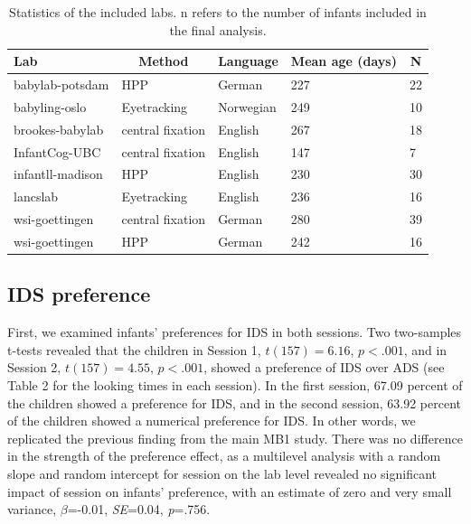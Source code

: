 \documentclass[
  man,floatsintext]{apa6}
\begin{document}
\begin{table}[tbp]

\begin{center}
\begin{threeparttable}

\caption{\label{tab:labs}Statistics of the included labs. n refers to the number of infants included in the final analysis.}

\begin{tabular}{lllll}
\toprule
Lab & \multicolumn{1}{c}{Method} & \multicolumn{1}{c}{Language} & \multicolumn{1}{c}{Mean age (days)} & \multicolumn{1}{c}{N}\\
\midrule
babylab-potsdam & HPP & German & 227 & 22\\
babyling-oslo & Eyetracking & Norwegian & 249 & 10\\
brookes-babylab & central fixation & English & 267 & 18\\
InfantCog-UBC & central fixation & English & 147 & 7\\
infantll-madison & HPP & English & 230 & 30\\
lancslab & Eyetracking & English & 236 & 16\\
wsi-goettingen & central fixation & German & 280 & 39\\
wsi-goettingen & HPP & German & 242 & 16\\
\bottomrule
\end{tabular}

\end{threeparttable}
\end{center}

\end{table}

\hypertarget{ids-preference}{%
\subsection{IDS preference}\label{ids-preference}}

First, we examined infants' preferences for IDS in both sessions. Two two-samples t-tests revealed that the children in Session 1, \(t(157) = 6.16\), \(p < .001\), and in Session 2, \(t(157) = 4.55\), \(p < .001\), showed a preference of IDS over ADS (see Table 2 for the looking times in each session). In the first session, 67.09 percent of the children showed a preference for IDS, and in the second session, 63.92 percent of the children showed a numerical preference for IDS. In other words, we replicated the previous finding from the main MB1 study. There was no difference in the strength of the preference effect, as a multilevel analysis with a random slope and random intercept for session on the lab level revealed no significant impact of session on infants' preference, with an estimate of zero and very small variance, \(\beta\)=-0.01, \emph{SE}=0.04, \emph{p}=.756.
\end{document}
